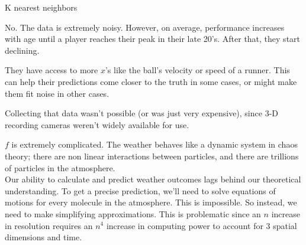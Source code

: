 \documentclass[12pt]{article}
\begin{document}

\begin{enumerate}


K nearest neighbors 


No. The data is extremely noisy. However, on average, performance increases with age until a player reaches their peak in their late 20's. After that, they start declining. 


They have access to more $x$'s like the ball's velocity or speed of a runner. This can help their predictions come closer to the truth in some cases, or might make them fit noise in other cases. 


Collecting that data wasn't possible (or was just very expensive), since 3-D recording cameras weren't widely available for use. 


$f$ is extremely complicated. The weather behaves like a dynamic system in chaos theory; there are non linear interactions between particles, and there are trillions of particles in the atmosphere. \\
Our ability to calculate and predict weather outcomes lags behind our theoretical understanding. To get a precise prediction, we'll need to solve equations of motions for every molecule in the atmosphere. This is impossible. So instead, we need to make simplifying approximations. This is problematic since an $n$ increase in resolution requires an $n^4$ increase in computing power to account for 3 spatial dimensions and time.


\end{enumerate}
\end{document}
